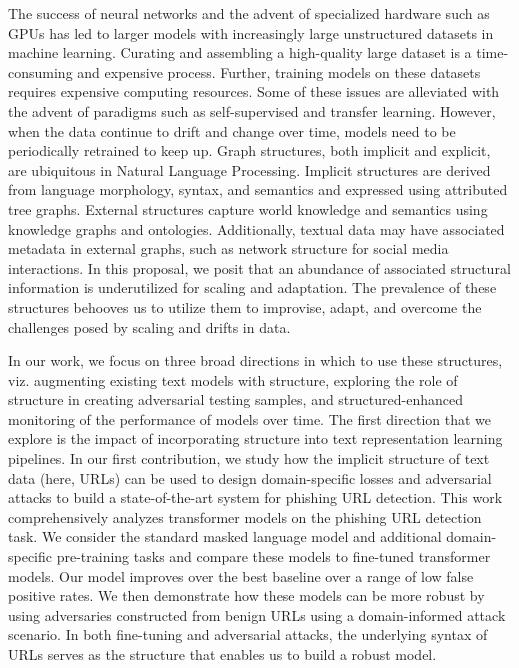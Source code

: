 
The success of neural networks and the advent of specialized hardware such as GPUs has led to larger models with increasingly large unstructured datasets in machine learning.
Curating and assembling a high-quality large dataset is a time-consuming and expensive process.
Further, training models on these datasets requires expensive computing resources.
Some of these issues are alleviated with the advent of paradigms such as self-supervised and transfer learning.
However, when the data continue to drift and change over time,
models need to be periodically retrained to keep up.
Graph structures, both implicit and explicit, are ubiquitous in Natural Language Processing.
Implicit structures are derived from language morphology, syntax, and semantics and expressed using attributed tree graphs.
External structures capture world knowledge and semantics using knowledge graphs and ontologies.
Additionally, textual data may have associated metadata in external graphs, such as network structure for social media interactions.
In this proposal, we posit that an abundance of associated structural information is underutilized for scaling and adaptation.
The prevalence of these structures behooves us to utilize them to improvise, adapt, and overcome the challenges posed by scaling and drifts in data.

In our work, we focus on three broad directions in which to use these structures, viz. augmenting existing text models with structure, exploring the role of structure in creating adversarial testing samples, and structured-enhanced monitoring of the performance of models over time.
The first direction that we explore is the impact of incorporating structure into text representation learning pipelines.
In our first contribution, we study how the implicit structure of text data (here, URLs) can be used to design domain-specific losses and adversarial attacks to build a state-of-the-art system for phishing URL detection.
This work comprehensively analyzes transformer models on the phishing URL detection task.
We consider the standard masked language model and additional domain-specific pre-training tasks and compare these models to fine-tuned transformer models.
Our model improves over the best baseline over a range of low false positive rates.
We then demonstrate how these models can be more robust by using adversaries constructed from benign URLs using a domain-informed attack scenario. 
In both fine-tuning and adversarial attacks, the underlying syntax of URLs serves as the structure that enables us to build a robust model.


